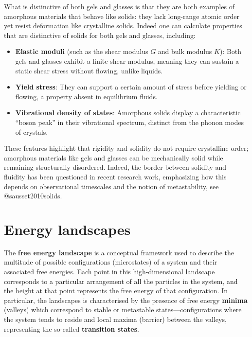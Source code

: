 \documentclass[
  letterpaper,
  enabledeprecatedfontcommands]{report}
\providecommand{\tightlist}{%
  \setlength{\itemsep}{0pt}\setlength{\parskip}{0pt}}
\begin{document}
What is distinctive of both gels and glasses is that they are both
examples of amorphous materials that behave like solids: they lack
long-range atomic order yet resist deformation like crystalline solids.
Indeed one can calculate properties that are distinctive of solids for
both gels and glasses, including:

\begin{itemize}
\tightlist
\item
  \textbf{Elastic moduli} (such as the shear modulus \(G\) and bulk
  modulus \(K\)): Both gels and glasses exhibit a finite shear modulus,
  meaning they can sustain a static shear stress without flowing, unlike
  liquids.
\item
  \textbf{Yield stress}: They can support a certain amount of stress
  before yielding or flowing, a property absent in equilibrium fluids.
\item
  \textbf{Vibrational density of states}: Amorphous solids display a
  characteristic ``boson peak'' in their vibrational spectrum, distinct
  from the phonon modes of crystals.
\end{itemize}

These features highlight that rigidity and solidity do not require
crystalline order; amorphous materials like gels and glasses can be
mechanically solid while remaining structurally disordered. Indeed, the
border between solidity and fluidity has been questioned in recent
research work, emphasizing how this depends on observational timescales
and the notion of metastability, see @sausset2010solids.

\section{Energy landscapes}\label{sec-energy-landscapes}

The \textbf{free energy landscape} is a conceptual framework used to
describe the multitude of possible configurations (microstates) of a
system and their associated free energies. Each point in this
high-dimensional landscape corresponds to a particular arrangement of
all the particles in the system, and the height at that point represents
the free energy of that configuration. In particular, the landscapes is
characterised by the presence of free energy \textbf{minima} (valleys)
which correspond to stable or metastable states---configurations where
the system tends to reside and local maxima (barrier) between the
valleys, representing the so-called \textbf{transition states}.
\end{document}
